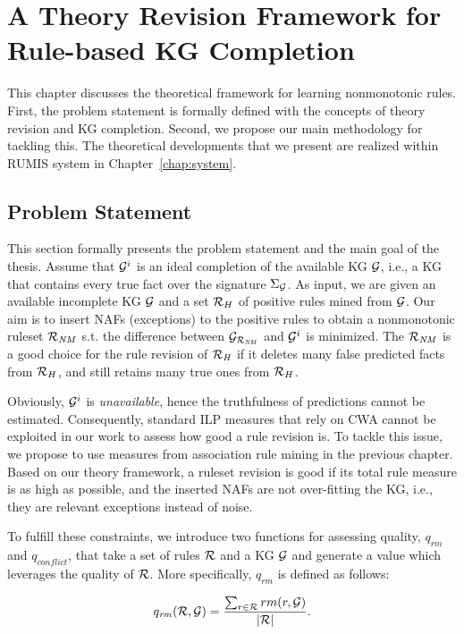 \chapter{A Theory Revision Framework for Rule-based KG Completion}
\label{chap:frame}

This chapter discusses the theoretical framework for learning nonmonotonic rules. First, the problem statement is formally defined with the concepts of theory revision and KG completion. Second, we propose our main methodology for tackling this. The theoretical developments that we present are realized within RUMIS system in Chapter~\ref{chap:system}.

\section{Problem Statement}

This section formally presents the problem statement and the main goal of the thesis. Assume that $\mathcal{G}^i$ is an ideal completion of the available KG $\mathcal{G}$, i.e., a KG that contains every true fact over the signature $\Sigma_{\mathcal{G}}$. As input, we are given an available incomplete KG $\mathcal{G}$ and a set $\mathcal{R}_H$ of positive rules mined from $\mathcal{G}$. Our aim is to insert NAFs (exceptions) to the positive rules to obtain a nonmonotonic ruleset $\mathcal{R}_{\mathit{NM}}$ s.t. the difference between $\mathcal{G}_{\mathcal{R}_{\mathit{NM}}}$ and $\mathcal{G}^i$ is minimized. The $\mathcal{R}_{\mathit{NM}}$ is a good choice for the rule revision of $\mathcal{R}_{\mathit{H}}$ if it deletes many false predicted facts from $\mathcal{R}_H$, and still retains many true ones from $\mathcal{R}_H$.

Obviously, $\mathcal{G}^i$ is \emph{unavailable}, hence the truthfulness of predictions cannot be estimated. Consequently, standard ILP measures that rely on CWA cannot be exploited in our work to assess how good a rule revision is. To tackle this issue, we propose to use measures from association rule mining in the previous chapter. Based on our theory framework, a ruleset revision is good if its total rule measure is as high as possible, and the inserted NAFs are not over-fitting the KG, i.e., they are relevant exceptions instead of noise.

To fulfill these constraints, we introduce two functions for assessing quality, $q_{rm}$ and $q_{conflict}$, that take a set of rules $\mathcal{R}$ and a KG $\mathcal{G}$ and generate a value which leverages the quality of $\mathcal{R}$. More specifically, $q_{rm}$ is defined as follows:

\begin{equation}
q_{\mathit{rm}}(\mathcal{R},\mathcal{G})=\dfrac{\sum_{r\in \mathcal{R}}rm(r,\mathcal{G})}{|\mathcal{R}|}.
\end{equation}

